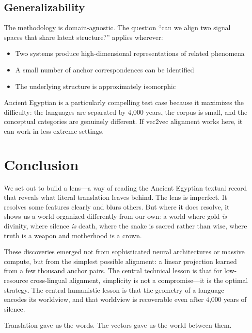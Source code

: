 \documentclass[11pt, a4paper]{article}
\begin{document}
\subsection{Generalizability}

The methodology is domain-agnostic. The question ``can we align two signal spaces that share latent structure?'' applies wherever:

\begin{itemize}[nosep]
    \item Two systems produce high-dimensional representations of related phenomena
    \item A small number of anchor correspondences can be identified
    \item The underlying structure is approximately isomorphic
\end{itemize}

Ancient Egyptian is a particularly compelling test case because it maximizes the difficulty: the languages are separated by 4,000 years, the corpus is small, and the conceptual categories are genuinely different. If vec2vec alignment works here, it can work in less extreme settings.

\section{Conclusion}
\label{sec:conclusion}

We set out to build a lens---a way of reading the Ancient Egyptian textual record that reveals what literal translation leaves behind. The lens is imperfect. It resolves some features clearly and blurs others. But where it does resolve, it shows us a world organized differently from our own: a world where gold \textit{is} divinity, where silence \textit{is} death, where the snake is sacred rather than wise, where truth is a weapon and motherhood is a crown.

These discoveries emerged not from sophisticated neural architectures or massive compute, but from the simplest possible alignment: a linear projection learned from a few thousand anchor pairs. The central technical lesson is that for low-resource cross-lingual alignment, simplicity is not a compromise---it is the optimal strategy. The central humanistic lesson is that the geometry of a language encodes its worldview, and that worldview is recoverable even after 4,000 years of silence.

Translation gave us the words. The vectors gave us the world between them.
\end{document}
